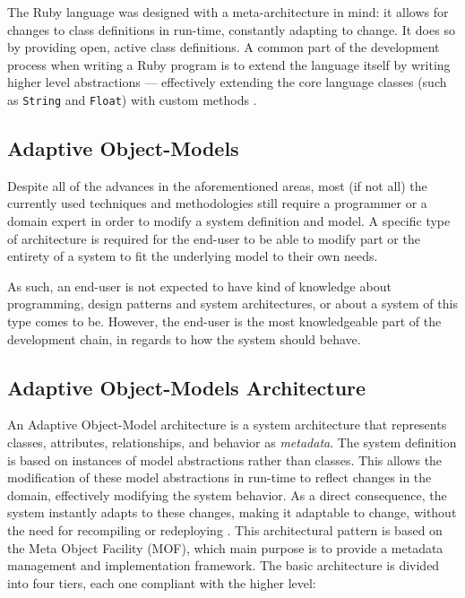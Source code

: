 The Ruby language was designed with a meta-architecture in mind: it allows for changes to class definitions in run-time, constantly adapting to change. It does so by providing open, active class definitions. A common part of the development process when writing a Ruby program is to extend the language itself by writing higher level abstractions --- effectively extending the core language classes (such as \verb!String! and \verb!Float!) with custom methods \cite{metaprogramming_ruby}.

\subsection{Adaptive Object-Models}\label{sec:aom}

Despite all of the advances in the aforementioned areas, most (if not all) the currently used techniques and methodologies still require a programmer or a domain expert in order to modify a system definition and model. A specific type of architecture is required for the end-user to be able to modify part or the entirety of a system to fit the underlying model to their own needs.

As such, an end-user is not expected to have kind of knowledge about programming, design patterns and system architectures, or about a system of this type comes to be. However, the end-user is the most knowledgeable part of the development chain, in regards to how the system should behave.

\subsection{Adaptive Object-Models Architecture}\label{sec:aom_architecture}

An Adaptive Object-Model architecture is a system architecture that represents classes, attributes, relationships, and behavior as \textit{metadata}. The system definition is based on instances of model abstractions rather than classes. This allows the modification of these model abstractions in run-time to reflect changes in the domain, effectively modifying the system behavior. As a direct consequence, the system instantly adapts to these changes, making it adaptable to change, without the need for recompiling or redeploying \cite{YBJ01}. This architectural pattern is based on the Meta Object Facility (MOF), which main purpose is to provide a metadata management and implementation framework. The basic architecture is divided into four tiers, each one compliant with the higher level: \cite{mof}

